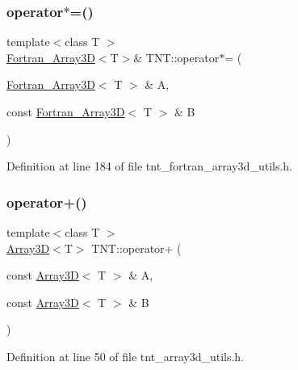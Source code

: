 \subsubsection{\texorpdfstring{operator$\ast$=()}{operator*=()}\hspace{0.1cm}{\footnotesize\ttfamily [5/5]}}
{\footnotesize\ttfamily template$<$class T $>$ \\
\hyperlink{classTNT_1_1Fortran__Array3D}{Fortran\+\_\+\+Array3D}$<$T$>$\& T\+N\+T\+::operator$\ast$= (\begin{DoxyParamCaption}\item[{\hyperlink{classTNT_1_1Fortran__Array3D}{Fortran\+\_\+\+Array3D}$<$ T $>$ \&}]{A,  }\item[{const \hyperlink{classTNT_1_1Fortran__Array3D}{Fortran\+\_\+\+Array3D}$<$ T $>$ \&}]{B }\end{DoxyParamCaption})}



Definition at line 184 of file tnt\+\_\+fortran\+\_\+array3d\+\_\+utils.\+h.

\mbox{\label{namespaceTNT_a05f55a06994091a44d0c6ae743d9c0fc}} 
\subsubsection{\texorpdfstring{operator+()}{operator+()}\hspace{0.1cm}{\footnotesize\ttfamily [1/7]}}
{\footnotesize\ttfamily template$<$class T $>$ \\
\hyperlink{classTNT_1_1Array3D}{Array3D}$<$T$>$ T\+N\+T\+::operator+ (\begin{DoxyParamCaption}\item[{const \hyperlink{classTNT_1_1Array3D}{Array3D}$<$ T $>$ \&}]{A,  }\item[{const \hyperlink{classTNT_1_1Array3D}{Array3D}$<$ T $>$ \&}]{B }\end{DoxyParamCaption})}



Definition at line 50 of file tnt\+\_\+array3d\+\_\+utils.\+h.

\mbox{\label{namespaceTNT_a25681ebc742c0ffb1fc09d8988a7314c}} 
